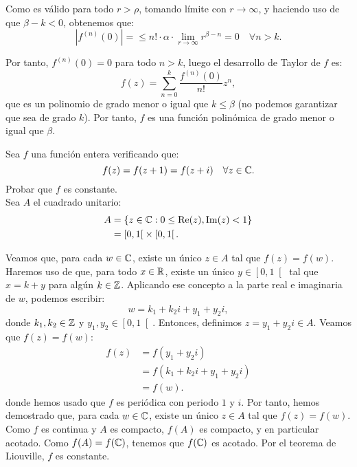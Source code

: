 \begin{ejercicio}
    Como es válido para todo $r>\rho$, tomando límite con $r\to \infty$, y haciendo uso de que $\beta-k<0$, obtenemos que:
    \begin{equation*}
        |f^{(n)}(0)|=\leq n!\cdot \alpha \cdot \lim_{r\to \infty} r^{\beta-n}=0 \quad \forall n>k.
    \end{equation*}

    Por tanto, $f^{(n)}(0)=0$ para todo $n>k$, luego el desarrollo de Taylor de $f$ es:
    \begin{equation*}
        f(z)=\sum_{n=0}^{k} \dfrac{f^{(n)}(0)}{n!} z^n,
    \end{equation*}
    que es un polinomio de grado menor o igual que $k\leq \beta$ (no podemos garantizar que sea de grado $k$). Por tanto, $f$ es una función polinómica de grado menor o igual que $\beta$.
\end{ejercicio}

\begin{ejercicio}
    Sea $f$ una función entera verificando que:
    \begin{equation*}
        f(z)=f(z+1)=f(z+i) \quad \forall z\in \mathbb{C}.
    \end{equation*}
    Probar que $f$ es constante.\\

    Sea $A$ el cuadrado unitario:
    \begin{align*}
        A &= \left\{ z\in \mathbb{C} : 0\leq \operatorname{Re}(z),\operatorname{Im}(z)<1 \right\} \\
        &= \left[0,1\right[ \times \left[0,1\right[.
    \end{align*}

    Veamos que, para cada $w\in \mathbb{C}$, existe un único $z\in A$ tal que $f(z)=f(w)$. Haremos uso de que, para todo $x\in \mathbb{R}$, existe un único $y\in \left[0,1\right[$ tal que $x=k+y$ para algún $k\in \mathbb{Z}$. Aplicando ese concepto a la parte real e imaginaria de $w$, podemos escribir:
    \begin{equation*}
        w=k_1 + k_2 i + y_1 + y_2 i,
    \end{equation*}
    donde $k_1,k_2\in \mathbb{Z}$ y $y_1,y_2\in \left[0,1\right[$. Entonces, definimos $z=y_1 + y_2 i\in A$. Veamos que $f(z)=f(w)$:
    \begin{align*}
        f(z) &= f(y_1 + y_2 i) \\
        &= f(k_1 + k_2 i + y_1 + y_2 i) \\
        &= f(w).
    \end{align*}
    donde hemos usado que $f$ es periódica con periodo $1$ y $i$. Por tanto, hemos demostrado que, para cada $w\in \mathbb{C}$, existe un único $z\in A$ tal que $f(z)=f(w)$.\\

    Como $f$ es continua y $A$ es compacto, $f(A)$ es compacto, y en particular acotado. Como $f(A)=f(\mathbb{C})$, tenemos que $f(\mathbb{C})$ es acotado. Por el teorema de Liouville, $f$ es constante.
\end{ejercicio}


